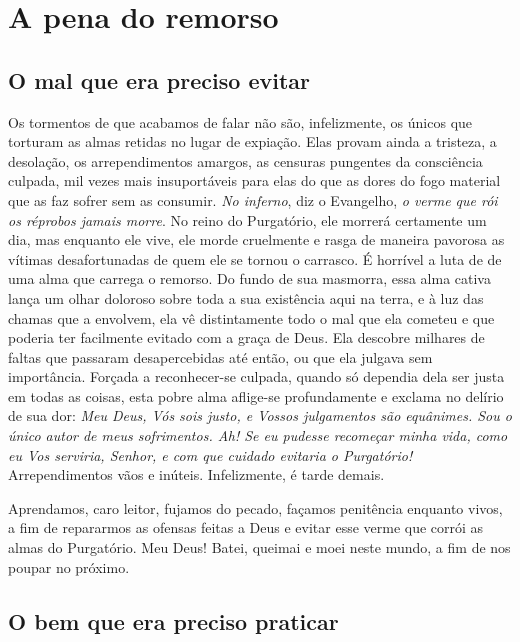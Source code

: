 \renewcommand{\thechapterdisplay}{Sétimo dia}
\renewcommand{\thechapterrunner}{A pena do remorso}
\chapter[Sétimo dia --- A pena do remorso]{A pena do remorso}
\section*{O mal que era preciso evitar}


Os tormentos de que acabamos de falar não são, infelizmente, os únicos que torturam as almas retidas no lugar de expiação. Elas provam ainda a tristeza, a desolação, os arrependimentos amargos, as censuras pungentes da consciência culpada, mil vezes mais insuportáveis para elas do que as dores do fogo material que as faz sofrer sem as consumir. \textit{No inferno}, diz o Evangelho, \textit{o verme que rói os réprobos jamais morre}. No reino do Purgatório, ele morrerá certamente um dia, mas enquanto ele vive, ele morde cruelmente e rasga de maneira pavorosa as vítimas desafortunadas de quem ele se tornou o carrasco. É horrível a luta de de uma alma que carrega o remorso. Do fundo de sua masmorra, essa alma cativa lança um olhar doloroso sobre toda a sua existência aqui na terra, e à luz das chamas que a envolvem, ela vê distintamente todo o mal que ela cometeu e que poderia ter facilmente evitado com a graça de Deus. Ela descobre milhares de faltas que passaram desapercebidas até então, ou que ela julgava sem importância. Forçada a reconhecer-se culpada, quando só dependia dela ser justa em todas as coisas, esta pobre alma aflige-se profundamente e exclama no delírio de sua dor: \textit{Meu Deus, Vós sois justo, e Vossos julgamentos são equânimes. Sou o único autor de meus sofrimentos. Ah! Se eu pudesse recomeçar minha vida, como eu Vos serviria, Senhor, e com que cuidado evitaria o Purgatório!} Arrependimentos vãos e inúteis. Infelizmente, é tarde demais.

Aprendamos, caro leitor, fujamos do pecado, façamos penitência enquanto vivos, a fim de repararmos as ofensas feitas a Deus e evitar esse verme que corrói as almas do Purgatório. Meu Deus! Batei, queimai e moei neste mundo, a fim de nos poupar no próximo.


\section*{O bem que era preciso praticar}


